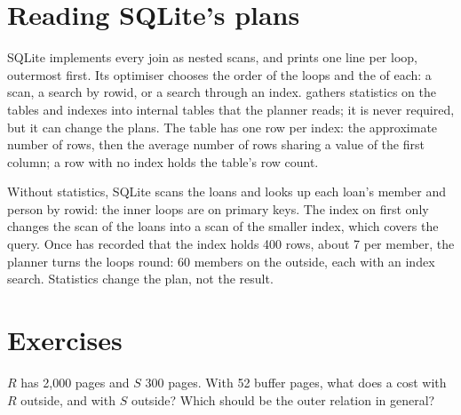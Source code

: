 \section{Reading SQLite's plans}\label{sec:b3:query-optimisation:sqlite}

SQLite implements every join as nested scans, and  prints one line per loop, outermost first. %
Its optimiser chooses the order of the loops and the  of each: a scan, a search by rowid, or a search through an index.  gathers statistics on the tables and indexes into internal tables that the planner reads; it is never required, but it can change the plans. %
The table  has one row per index: the approximate number of rows, then the average number of rows sharing a value of the first column; a row with no index holds the table's row count. %

\label{out:b3:query-optimisation:plans}

\label{out:b3:query-optimisation:analyze}

Without statistics, SQLite scans the loans and looks up each loan's member and person by rowid: the inner loops are  on primary keys. The index on  first only changes the scan of the loans into a scan of the smaller index, which covers the query. Once  has recorded that the index holds 400 rows, about 7 per member, the planner turns the loops round: 60 members on the outside, each with an index search. Statistics change the plan, not the result.

\section{Exercises}\label{sec:b3:query-optimisation:exercises}

\begin{exercise}[$\star$]\label{exo:b3:query-optimisation:1}
$R$ has 2,000 pages and $S$ 300 pages. With 52 buffer pages, what does a  cost with $R$ outside, and with $S$ outside? Which should be the outer relation in general?
\end{exercise}

